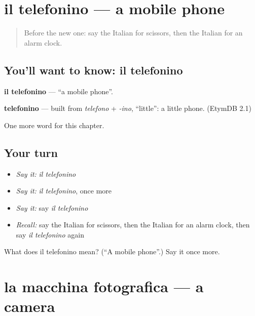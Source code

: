 \section[il telefonino]{il telefonino — a mobile phone}

\label{lesson:IT-C100-telefonino}



\begin{quote}
Before the new one: say the Italian for scissors, then the Italian for an alarm clock.
\end{quote}

\subsection*{You'll want to know: il telefonino}
\textbf{il telefonino} — \textquotedblleft{}a mobile phone\textquotedblright{}.

\begin{cousinweb}
\textbf{telefonino} — built from \emph{telefono} + \emph{-ino}, \textquotedblleft{}little\textquotedblright{}: a little phone. (EtymDB 2.1)
\end{cousinweb}

\begin{grammarlens}[title={What you've built}]
One more word for this chapter.
\end{grammarlens}

\subsection*{Your turn}
\begin{itemize}
\raggedright
  \item \emph{Say it:} \emph{il telefonino}
  \item \emph{Say it:} \emph{il telefonino}, once more
  \item \emph{Say it:} say \emph{il telefonino}
  \item \emph{Recall:} say the Italian for scissors, then the Italian for an alarm clock, then say \emph{il telefonino} again
\end{itemize}

\begin{tcolorbox}[breakable,colback=teal!4,colframe=teal!35!black,title={Before you move on}]
What does il telefonino mean? (\textquotedblleft{}A mobile phone\textquotedblright{}.) Say it once more.
\end{tcolorbox}
\section[la macchina fotografica]{la macchina fotografica — a camera}

